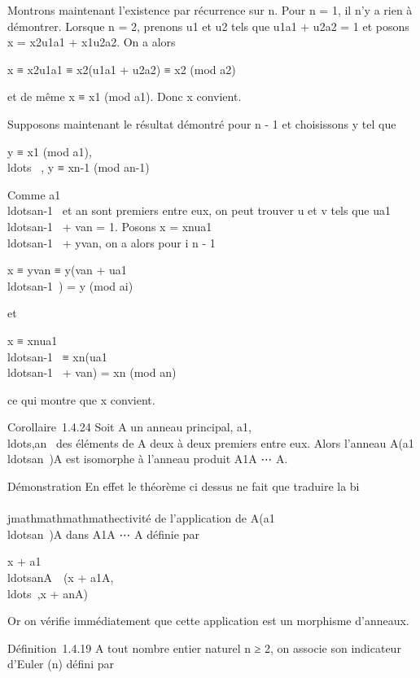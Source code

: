 Montrons maintenant l'existence par récurrence sur n. Pour n = 1, il n'y
a rien à démontrer. Lorsque n = 2, prenons u1 et u2
tels que u1a1 + u2a2 = 1 et
posons x = x2u1a1 +
x1u2a2. On a alors

x ≡ x2u1a1 ≡
x2(u1a1 + u2a2) ≡
x2 (mod\,\,a2)

et de même x ≡ x1
(mod\,\,a1). Donc x convient.

Supposons maintenant le résultat démontré pour n - 1 et choisissons y
tel que

y ≡ x1
(mod\,\,a1),\quad
\\ldots~\quad
, y ≡ xn-1
(mod\,\,an-1)

Comme
a1\\ldotsan-1~
et an sont premiers entre eux, on peut trouver u et v tels que
ua1\\ldotsan-1~
+ van = 1. Posons x =
xnua1\\ldotsan-1~
+ yvan, on a alors pour i \leq n - 1

x ≡ yvan ≡ y(van +
ua1\\ldotsan-1~)
= y (mod\,\,ai)

et

x ≡
xnua1\\ldotsan-1~
≡
xn(ua1\\ldotsan-1~
+ van) = xn
(mod\,\,an)

ce qui montre que x convient.

Corollaire~1.4.24 Soit A un anneau principal,
a1,\\ldots,an~
des éléments de A deux à deux premiers entre eux. Alors l'anneau
A\diagup(a1\\ldotsan~)A
est isomorphe à l'anneau produit A\diagupa1A
\times⋯ \times A\diagupanA.

Démonstration En effet le théorème ci dessus ne fait que traduire la
bi\\\\jmathmathmathmathectivité de l'application de
A\diagup(a1\\ldotsan~)A
dans A\diagupa1A \times⋯ \times A\diagupanA
définie par

x +
a1\\ldotsanA\mathrel\mapsto~~(x
+
a1A,\\ldots~,x
+ anA)

Or on vérifie immédiatement que cette application est un morphisme
d'anneaux.

Définition~1.4.19 A tout nombre entier naturel n ≥ 2, on associe son
indicateur d'Euler \phi(n) défini par

